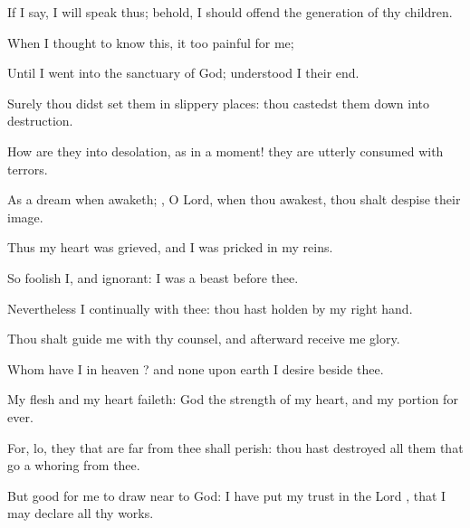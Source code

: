 {\Q {}If I
say, I will
speak
thus; behold, I should
offend
{} the
generation of thy
children.


\par }{\Q {}When I
thought to
know this, it
{} too
painful for
me;


\par }{\Q {}Until I
went into the
sanctuary of
God;
{}
understood I their
end.


\par }{\Q {}Surely thou didst
set them in slippery
places: thou castedst them
down into
destruction.


\par }{\Q {}How are they
{} into
desolation, as in a
moment! they are
utterly
consumed with
terrors.


\par }{\Q {}As a
dream when
{}
awaketh;
{}, O
Lord, when thou
awakest, thou shalt
despise their
image.


\par }{\BB \par }
{\Q {}Thus my
heart was
grieved, and I was
pricked in my
reins.


\par }{\Q {}So
foolish
{} I, and
ignorant: I was
{} a
beast before thee.


\par }{\Q {}Nevertheless I
{}
continually with thee: thou hast
holden
{} by my
right
hand.


\par }{\Q {}Thou shalt
guide me with thy
counsel, and
afterward
receive me
{}
glory.


\par }{\Q {}Whom have I in
heaven
{}? and
{} none upon
earth
{} I
desire beside thee.


\par }{\Q {}My
flesh and my
heart
faileth:
{}
God
{} the
strength of my
heart, and my
portion for
ever.


\par }{\Q {}For, lo, they that are
far from thee shall
perish: thou hast
destroyed all them that go a
whoring from thee.


\par }{\Q {}But
{}
good for me to draw
near to
God: I have
put my
trust in the
Lord
{}, that I may
declare all thy
works.




\par }
